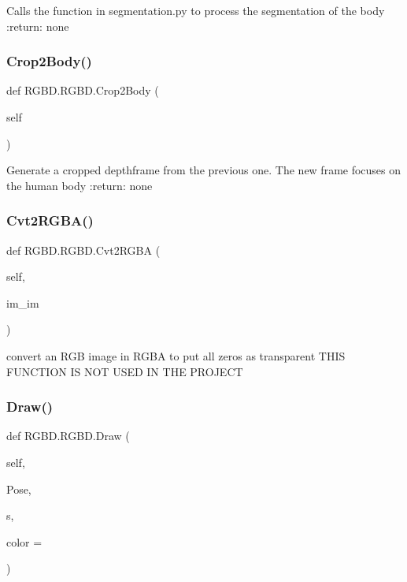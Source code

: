 \begin{DoxyVerb}Calls the function in segmentation.py to process the segmentation of the body
:return:  none
\end{DoxyVerb}
 \mbox{\label{class_r_g_b_d_1_1_r_g_b_d_a9581af6ebd3185db5b84b0851c7b431e}} 
\subsubsection{Crop2\+Body()}
{\footnotesize\ttfamily def R\+G\+B\+D.\+R\+G\+B\+D.\+Crop2\+Body (\begin{DoxyParamCaption}\item[{}]{self }\end{DoxyParamCaption})}

\begin{DoxyVerb}Generate a cropped depthframe from the previous one. The new frame focuses on the human body
:return: none
\end{DoxyVerb}
 \mbox{\label{class_r_g_b_d_1_1_r_g_b_d_a5e84e29e01792dc088319af0130e201c}} 
\subsubsection{Cvt2\+R\+G\+B\+A()}
{\footnotesize\ttfamily def R\+G\+B\+D.\+R\+G\+B\+D.\+Cvt2\+R\+G\+BA (\begin{DoxyParamCaption}\item[{}]{self,  }\item[{}]{im\+\_\+im }\end{DoxyParamCaption})}

\begin{DoxyVerb}convert an RGB image in RGBA to put all zeros as transparent
THIS FUNCTION IS NOT USED IN THE PROJECT
\end{DoxyVerb}
 \mbox{\label{class_r_g_b_d_1_1_r_g_b_d_ac3ebcc6ae06496726d76d73c5f83b735}} 
\subsubsection{Draw()}
{\footnotesize\ttfamily def R\+G\+B\+D.\+R\+G\+B\+D.\+Draw (\begin{DoxyParamCaption}\item[{}]{self,  }\item[{}]{Pose,  }\item[{}]{s,  }\item[{}]{color = {} }\end{DoxyParamCaption})}



